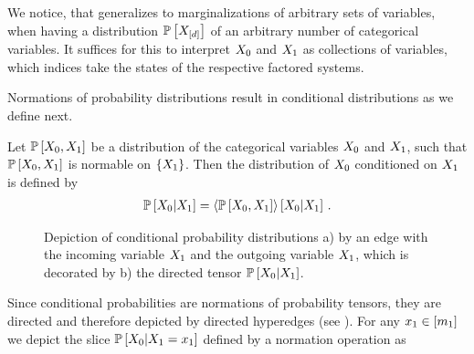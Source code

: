 We notice, that  generalizes to marginalizations of arbitrary sets of variables, when having a distribution $\mathbb{P}\left[X_{[d]}\right]$ of an arbitrary number of categorical variables.
It suffices for this to interpret $X_{0}$ and $X_{1}$ as collections of variables, which indices take the states of the respective factored systems.


Normations of probability distributions result in conditional distributions as we define next.

\begin{definition}
    \label{def:conditionalProbability}
    Let $\mathbb{P}\left[X_{0},X_{1}\right]$ be a distribution of the categorical variables $X_{0}$ and $X_{1}$, such that $\mathbb{P}\left[X_{0},X_{1}\right]$ is normable on $\{X_{1}\}$.
    Then the distribution of $X_{0}$ conditioned on $X_{1}$ is defined by
    \begin{align*}
        \mathbb{P}\left[X_{0}|X_{1}\right]
        = \left\langle \mathbb{P}\left[X_{0},X_{1}\right]\right\rangle \left[ X_{0} | X_{1} \right] \, .
    \end{align*}
\end{definition}

\begin{figure}[hbt!]
    \begin{center}
        
    \end{center}
    \caption{Depiction of conditional probability distributions a) by an edge with the incoming variable $X_{1}$ and the outgoing variable $X_{1}$, which is decorated by b) the directed tensor $\mathbb{P}\left[X_{0}|X_{1}\right]$. }
    \label{fig:conditionalDistribution}
\end{figure}

Since conditional probabilities are normations of probability tensors, they are directed and therefore depicted by directed hyperedges (see ).
For any $x_{1}\in[m_{1}]$ we depict the slice $\mathbb{P}\left[X_{0}|X_{1}=x_{1}\right]$ defined by a normation operation as
\begin{center}
    
\end{center}


